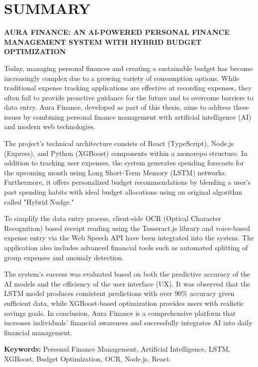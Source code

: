 \chapter*{SUMMARY}

\begin{center}
{\large \textbf{AURA FINANCE: AN AI-POWERED PERSONAL FINANCE MANAGEMENT SYSTEM WITH HYBRID BUDGET OPTIMIZATION}}
\end{center}
\vspace{1cm}

Today, managing personal finances and creating a sustainable budget has become increasingly complex due to a growing variety of consumption options. While traditional expense tracking applications are effective at recording expenses, they often fail to provide proactive guidance for the future and to overcome barriers to data entry. Aura Finance, developed as part of this thesis, aims to address these issues by combining personal finance management with artificial intelligence (AI) and modern web technologies.

The project's technical architecture consists of React (TypeScript), Node.js (Express), and Python (XGBoost) components within a monorepo structure. In addition to tracking user expenses, the system generates spending forecasts for the upcoming month using Long Short-Term Memory (LSTM) networks. Furthermore, it offers personalized budget recommendations by blending a user's past spending habits with ideal budget allocations using an original algorithm called "Hybrid Nudge."

To simplify the data entry process, client-side OCR (Optical Character Recognition) based receipt reading using the Tesseract.js library and voice-based expense entry via the Web Speech API have been integrated into the system. The application also includes advanced financial tools such as automated splitting of group expenses and anomaly detection.

The system's success was evaluated based on both the predictive accuracy of the AI models and the efficiency of the user interface (UX). It was observed that the LSTM model produces consistent predictions with over 90\% accuracy given sufficient data, while XGBoost-based optimization provides users with realistic savings goals. In conclusion, Aura Finance is a comprehensive platform that increases individuals' financial awareness and successfully integrates AI into daily financial management.

\textbf{Keywords:} Personal Finance Management, Artificial Intelligence, LSTM, XGBoost, Budget Optimization, OCR, Node.js, React.
